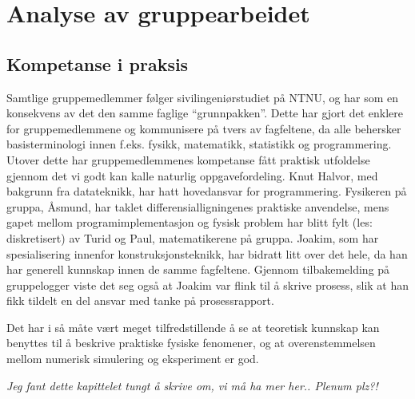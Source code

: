 
\chapter{Analyse av gruppearbeidet}

\section{Kompetanse i praksis}

Samtlige gruppemedlemmer følger sivilingeniørstudiet på NTNU, og har som en
konsekvens av det den samme faglige ``grunnpakken''. Dette har gjort det enklere
for gruppemedlemmene og kommunisere på tvers av fagfeltene, da alle behersker
basisterminologi innen f.eks. fysikk, matematikk, statistikk og programmering. Utover
dette har gruppemedlemmenes kompetanse fått praktisk utfoldelse gjennom det vi
godt kan kalle naturlig oppgavefordeling. Knut Halvor, med bakgrunn fra
datateknikk, har hatt hovedansvar for programmering. Fysikeren på gruppa,
Åsmund, har taklet differensialligningenes praktiske anvendelse, mens gapet
mellom programimplementasjon og fysisk problem har blitt fylt (les:
diskretisert) av Turid og Paul, matematikerene på gruppa. Joakim, som har
spesialisering innenfor konstruksjonsteknikk, har bidratt litt over det hele, da
han har generell kunnskap innen de samme fagfeltene. Gjennom tilbakemelding på
gruppelogger viste det seg også at Joakim var flink til å skrive prosess, slik
at han fikk tildelt en del ansvar med tanke på prosessrapport. 

Det har i så måte vært meget tilfredstillende å se at teoretisk kunnskap kan
benyttes til å beskrive praktiske fysiske fenomener, og at overenstemmelsen
mellom numerisk simulering og eksperiment er god. 

\emph{Jeg fant dette kapittelet tungt å skrive om, vi må ha mer her.. Plenum
plz?!}

